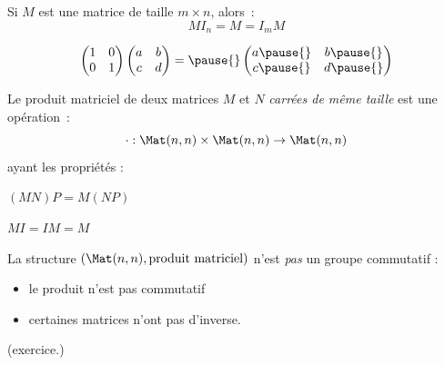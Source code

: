 \begin{frame}
\begin{proposition}
  Si \(M\) est une matrice de taille \(m\times n\), alors~:\pause{}
  \begin{equation*}
    M I_{n} = M = I_{m} M
  \end{equation*}
\end{proposition}
\begin{example}
  \begin{equation*}
  \begin{pmatrix}
    1 & 0\\ 0& 1
  \end{pmatrix}
  \begin{pmatrix}
    a & b\\ c& d
  \end{pmatrix}
  =\pause{}
\begin{pmatrix} a\pause{} & b\pause{}\\ c\pause{}& d\pause{}
  \end{pmatrix}
\end{equation*}
\end{example}
\end{frame}
\begin{frame}
\begin{proposition}
    Le produit matriciel de deux matrices \(M\) et \(N\) \emph{carrées de même taille} est une opération~:
    \begin{equation*}
      \cdot : \Mat(n,n) \times \Mat(n,n) \to \Mat(n,n)
    \end{equation*}\pause{}
    ayant les propriétés :\pause{}
    \begin{description}[<+->]
    \item[Associativité] \((MN)P = M(NP)\)
    \item[Existence d'un neutre] \(MI = IM = M\)
    \end{description}
  \end{proposition}\pause{}
  \begin{remark*}
    La structure \((\Mat(n,n),\text{produit matriciel})\) n'est \emph{pas} un groupe commutatif\pause{} :
    \begin{itemize}[<+->]
    \item le produit n'est pas commutatif
    \item certaines matrices n'ont pas d'inverse.
    \end{itemize}\pause{}
    (exercice.)
  \end{remark*}
\end{frame}
